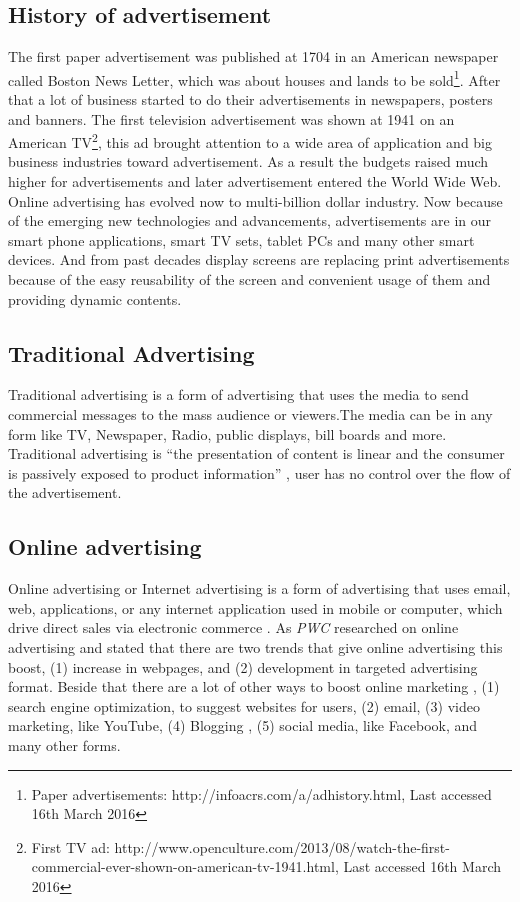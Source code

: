 \subsection{History of advertisement}
The first paper advertisement was published at 1704 in an American newspaper called Boston News Letter, which was about houses and lands to be sold\footnote{Paper advertisements: http://infoacrs.com/a/adhistory.html, Last accessed 16th March 2016}. After that a lot of business started to do their advertisements in newspapers, posters and banners. The first television advertisement was shown at 1941 on an American TV\footnote {First TV ad: http://www.openculture.com/2013/08/watch-the-first-commercial-ever-shown-on-american-tv-1941.html, Last accessed 16th March 2016}, this ad brought attention to a wide area of application and big business industries toward advertisement. As a result the budgets raised much higher for advertisements and later advertisement entered the World Wide Web. Online advertising has evolved now to multi-billion dollar industry. Now because of the emerging new technologies and advancements, advertisements are in our smart phone applications, smart TV sets, tablet PCs and many other smart devices. And from past decades display screens are replacing print advertisements because of the easy reusability of the screen and convenient usage of them and providing dynamic contents.

\subsection{Traditional Advertising}
Traditional advertising is a form of advertising that uses the media to send commercial messages to the mass audience or viewers.The media can be in any form like TV, Newspaper, Radio, public displays, bill boards and more. Traditional advertising is “the presentation of content is linear and the consumer is passively exposed to product information” \cite{Non_inter_vs_interAd}, user has no control over the flow of the advertisement. 


\subsection{Online advertising}
Online advertising or Internet advertising is a form of advertising that uses email, web, applications, or any internet application used in mobile or computer, which drive direct sales via electronic commerce \cite{onlinead}. As \emph{PWC}  \cite{pwc} researched on online advertising and stated that there are two trends that give online advertising this boost, (1) increase in webpages, and (2) development in targeted advertising format. Beside that there are a lot of other ways to boost online marketing \cite{waysmarketing}, (1) search engine optimization, to suggest websites for users, (2) email, (3) video marketing, like YouTube, (4) Blogging , (5) social media, like Facebook, and many other forms.


